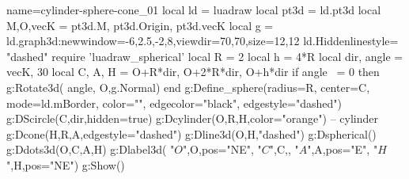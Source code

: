 \documentclass[border=3pt]{standalone}%
\begin{document}
\begin{luadraw}{name=cylinder-sphere-cone_01}
local ld = luadraw
local pt3d = ld.pt3d
local M,O,vecK = pt3d.M, pt3d.Origin,  pt3d.vecK
local g = ld.graph3d:new{window={-6,2.5,-2,8},viewdir={70,70},size={12,12}}
ld.Hiddenlinestyle= "dashed"
require 'luadraw_spherical'
local R = 2
local h = 4*R
local dir, angle = vecK, 30
local C, A, H = O+R*dir, O+2*R*dir, O+h*dir 
if angle ~= 0 then g:Rotate3d( angle, {O,g.Normal}) end
g:Define_sphere({radius=R, center=C, mode=ld.mBorder, color="", 
    edgecolor="black", edgestyle="dashed"})
g:DScircle({C,dir},{hidden=true})
g:Dcylinder(O,R,H,{color="orange"}) -- cylinder
g:Dcone(H,R,A,{edgestyle="dashed"})
g:Dline3d(O,H,"dashed")
g:Dspherical()
g:Ddots3d({O,C,A,H})
g:Dlabel3d( "$O$",O,{pos="NE"}, "$C$",C,{}, "$A$",A,{pos="E"}, "$H$",H,{pos="NE"})
g:Show()
\end{luadraw}
\end{document}
